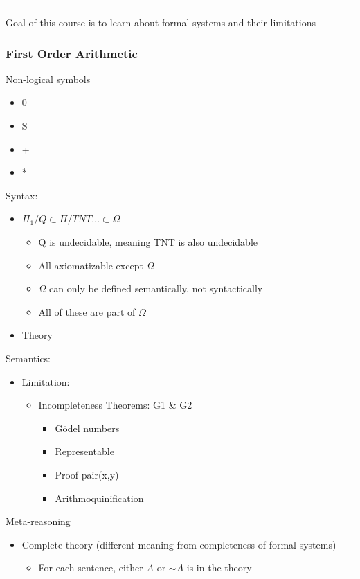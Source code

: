 \documentclass[11pt]{article}
\begin{document}
\noindent\rule{\textwidth}{0.5pt}
Goal of this course is to learn about formal systems and their limitations
\subsubsection{First Order Arithmetic}
\label{sec:org69d3cb0}
Non-logical symbols
\begin{itemize}
\item 0
\item S
\item +
\item *
\end{itemize}
Syntax:
\begin{itemize}
\item \(\Pi_1/Q \subset \Pi/TNT \ldots \subset \Omega\)
\begin{itemize}
\item Q is undecidable, meaning TNT is also undecidable
\item All axiomatizable except \(\Omega\)
\item \(\Omega\) can only be defined semantically, not syntactically
\item All of these are part of \(\Omega\)
\end{itemize}
\item Theory
\end{itemize}
Semantics:
\begin{itemize}
\item Limitation:
\begin{itemize}
\item Incompleteness Theorems: G1 \& G2
\begin{itemize}
\item Gödel numbers
\item Representable
\item Proof-pair(x,y)
\item Arithmoquinification
\end{itemize}
\end{itemize}
\end{itemize}
Meta-reasoning
\begin{itemize}
\item Complete theory (different meaning from completeness of formal systems)
\begin{itemize}
\item For each sentence, either \(A\) or \(\sim A\) is in the theory
\end{itemize}
\end{itemize}
\end{document}
